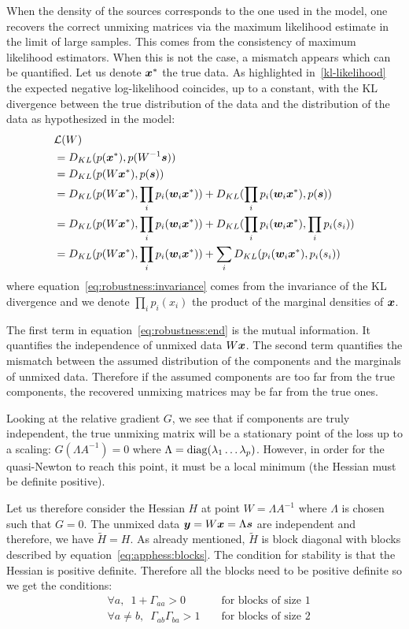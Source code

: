 When the density of the sources corresponds to the one used in the model, one
recovers the correct unmixing matrices via the maximum likelihood estimate in the
limit of large samples. This comes from the consistency of maximum likelihood
estimators.
When this is not the case, a mismatch appears which can be quantified. Let us
denote $\boldsymbol{x}^*$ the true data. As highlighted in~\eqref{kl-likelihood} the expected
negative log-likelihood coincides, up to a constant, with the KL divergence between the true
distribution of the data and the distribution of the data as hypothesized in the
model:
\begin{align}
  &\mathcal{L}(W) \\
  &=  D_{KL}(p(\boldsymbol{x}^*), p(W^{-1} \boldsymbol{s})) \\
             &=  D_{KL}(p(W\boldsymbol{x}^*), p(\boldsymbol{s})) \label{eq:robustness:invariance}\\
             &=  D_{KL}(p(W \boldsymbol{x}^*), \prod_i p_i(\boldsymbol{w}_i\boldsymbol{x}^*)) + D_{KL}(\prod_i p_i(\boldsymbol{w}_i\boldsymbol{x}^*), p(\boldsymbol{s})) \\
             &=  D_{KL}(p(W \boldsymbol{x}^*), \prod_i p_i(\boldsymbol{w}_i\boldsymbol{x}^*)) + D_{KL}(\prod_i p_i(\boldsymbol{w}_i\boldsymbol{x}^*), \prod_i p_i(s_i)) \\
  &=  D_{KL}(p(W \boldsymbol{x}^*), \prod_i p_i(\boldsymbol{w}_i\boldsymbol{x}^*)) + \sum_i D_{KL}(p_i(\boldsymbol{w}_i\boldsymbol{x}^*), p_i(s_i)) \label{eq:robustness:end}
\end{align}
where equation~\eqref{eq:robustness:invariance} comes from the invariance of the KL divergence and we
denote $\prod_i p_i(x_i)$ the product of the marginal densities of $\boldsymbol{x}$.

The first term in equation~\eqref{eq:robustness:end} is the mutual information. It quantifies the
independence of unmixed data $W \boldsymbol{x}$. The second term quantifies the mismatch
between the assumed distribution of the components and the marginals of unmixed data.
Therefore if the assumed components are too far from the true components, the
recovered unmixing matrices may be far from the true ones.


Looking at the relative gradient $G$, we see that if components are truly
independent, the true unmixing matrix will be a stationary point of the loss up
to a scaling: $G(\Lambda A^{-1})=0$ where $\Lambda=\operatorname*{diag}(\lambda_1 \dots \lambda_p)$.
However, in order for the quasi-Newton to reach this point, it must be a local
minimum (the Hessian must be definite positive). 

Let us therefore consider the Hessian $H$ at point $W = \Lambda A^{-1}$ where
$\Lambda$ is chosen such that $G = 0$. The unmixed data $\boldsymbol{y} = W \boldsymbol{x} = \Lambda \boldsymbol{s}$ are independent and
therefore, we have $\tilde{H} = H$.
As already mentioned, $\tilde{H}$ is block diagonal with blocks described by equation~\eqref{eq:apphess:blocks}.
The condition for stability is that the Hessian is positive definite. Therefore
all the blocks need to be positive definite so we get the conditions:
\begin{align}
  & \forall a, \enspace 1 + \Gamma_{aa} > 0 && \text{ for blocks of size } 1 \\
  & \forall a \neq b, \enspace \Gamma_{ab}\Gamma_{ba} > 1 && \text{ for blocks of size } 2
\end{align}

